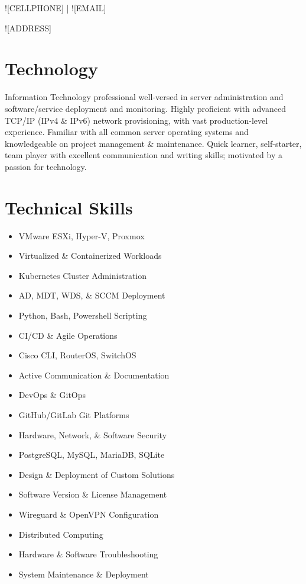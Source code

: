 \documentclass[a4paper]{article}
\renewcommand{\maketitle}{
    \begin{center}
        \color{white}
        {\huge\bfseries\theauthor}
        \vspace{.5em}

        \textsf{![CELLPHONE] | ![EMAIL]}\par
        \textsf{![ADDRESS]}

    \end{center}
}
\begin{document}
%

\author{\textsf{![FIRSTNAME] ![LASTNAME]}}
\maketitle

\section{Technology}


Information Technology professional well-versed in server administration and software/service deployment and monitoring. Highly proficient with advanced TCP/IP (IPv4 \& IPv6) network provisioning, with vast production-level experience. Familiar with all common server operating systems and knowledgeable on project management \& maintenance. Quick learner, self-starter, team player with excellent communication and writing skills; motivated by a passion for technology. 

\section{Technical Skills}

\begin{multicols}{2}
    \begin{itemize}
        \item VMware ESXi, Hyper-V, Proxmox
        \item Virtualized \& Containerized Workloads
        \item Kubernetes Cluster Administration
        \item AD, MDT, WDS, \& SCCM Deployment
        \item Python, Bash, Powershell Scripting
        \item CI/CD \& Agile Operations
        \item Cisco CLI, RouterOS, SwitchOS
        \item Active Communication \& Documentation
        \item DevOps \& GitOps
        \item GitHub/GitLab Git Platforms
        \item Hardware, Network, \& Software Security
        \item PostgreSQL, MySQL, MariaDB, SQLite
        \item Design \& Deployment of Custom Solutions
        \item Software Version \& License Management
        \item Wireguard \& OpenVPN Configuration
        \item Distributed Computing
        \item Hardware \& Software Troubleshooting
        \item System Maintenance \& Deployment

    \end{itemize}
\end{multicols}
\end{document}

